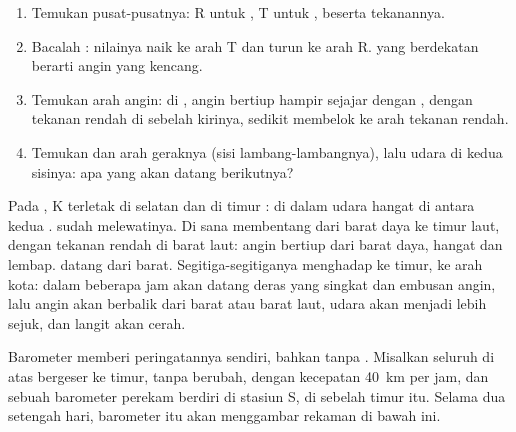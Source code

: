 \begin{method}
\begin{enumerate}
  \item Temukan pusat-pusatnya: R untuk , T untuk ,
        beserta tekanannya.
  \item Bacalah : nilainya naik ke arah T dan turun ke arah R.
         yang berdekatan berarti angin yang kencang.
  \item Temukan arah angin: di , angin bertiup hampir
        sejajar dengan , dengan tekanan rendah di sebelah kirinya,
        sedikit membelok ke arah tekanan rendah.
  \item Temukan  dan arah geraknya (sisi lambang-lambangnya),
        lalu udara di kedua sisinya: apa yang akan datang berikutnya?
\end{enumerate}
\end{method}

\begin{example}
Pada , K terletak di selatan  dan di timur :
di dalam udara hangat di antara kedua .  sudah
melewatinya. Di sana  membentang dari barat daya ke timur
laut, dengan tekanan rendah di barat laut: angin bertiup dari barat daya,
hangat dan lembap.  datang dari barat. Segitiga-segitiganya
menghadap ke timur, ke arah kota: dalam beberapa jam akan datang 
deras yang singkat dan embusan angin, lalu angin akan berbalik dari barat
atau barat laut, udara akan menjadi lebih sejuk, dan langit akan cerah.
\end{example}

Barometer memberi peringatannya sendiri, bahkan tanpa . Misalkan
seluruh  di atas bergeser ke timur, tanpa berubah, dengan kecepatan
\qty{40}{km} per jam, dan sebuah barometer perekam berdiri di stasiun S,
di sebelah timur  itu. Selama dua setengah hari, barometer itu
akan menggambar rekaman di bawah ini.

